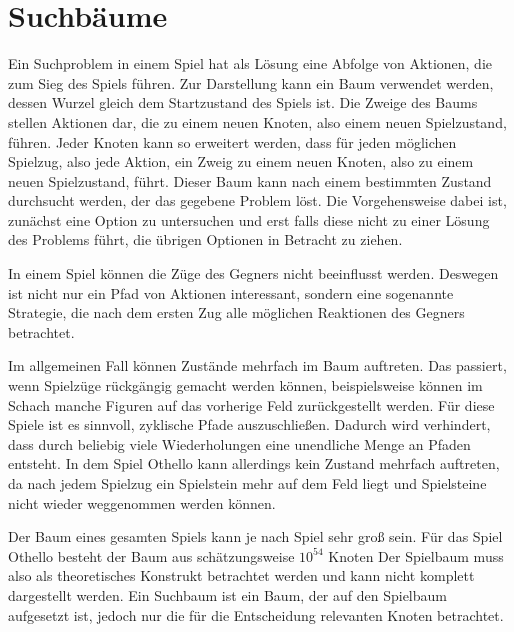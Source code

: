 \section{Suchbäume}

Ein Suchproblem in einem Spiel hat als Lösung eine Abfolge von Aktionen, die zum Sieg des Spiels führen.
Zur Darstellung kann ein Baum verwendet werden, dessen Wurzel gleich dem Startzustand des Spiels ist.
Die Zweige des Baums stellen Aktionen dar, die zu einem neuen Knoten, also einem neuen Spielzustand, führen.
Jeder Knoten kann so erweitert werden, dass für jeden möglichen Spielzug, also jede Aktion, ein Zweig zu einem neuen Knoten, also zu einem neuen Spielzustand, führt.
Dieser Baum kann nach einem bestimmten Zustand durchsucht werden, der das gegebene Problem löst.
Die Vorgehensweise dabei ist, zunächst eine Option zu untersuchen und erst falls diese nicht zu einer Lösung des Problems führt, die übrigen Optionen in Betracht zu ziehen.
\cite[S.~75]{ai2010russel}

In einem Spiel können die Züge des Gegners nicht beeinflusst werden.
Deswegen ist nicht nur ein Pfad von Aktionen interessant, sondern eine sogenannte Strategie, die nach dem ersten Zug alle möglichen Reaktionen des Gegners betrachtet.
\cite[S.~163]{ai2010russel}

Im allgemeinen Fall können Zustände mehrfach im Baum auftreten.
Das passiert, wenn Spielzüge rückgängig gemacht werden können, beispielsweise können im Schach manche Figuren auf das vorherige Feld zurückgestellt werden.
Für diese Spiele ist es sinnvoll, zyklische Pfade auszuschließen. %
Dadurch wird verhindert, dass durch beliebig viele Wiederholungen eine unendliche Menge an Pfaden entsteht.
\cite[S.~75]{ai2010russel}
In dem Spiel Othello kann allerdings kein Zustand mehrfach auftreten, da nach jedem Spielzug ein Spielstein mehr auf dem Feld liegt und Spielsteine nicht wieder weggenommen werden können.

Der Baum eines gesamten Spiels kann je nach Spiel sehr groß sein.
Für das Spiel Othello besteht der Baum aus schätzungsweise $10^{54}$ Knoten %
Der Spielbaum muss also als theoretisches Konstrukt betrachtet werden und kann nicht komplett dargestellt werden.
Ein Suchbaum ist ein Baum, der auf den Spielbaum aufgesetzt ist, jedoch nur die für die Entscheidung relevanten Knoten betrachtet.
\cite[S.~162f.]{ai2010russel}
